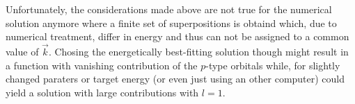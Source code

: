Unfortunately, the considerations made above are not true for the numerical solution anymore where a finite set of superpositions is obtaind which, due to numerical treatment, differ in energy and thus can not be assigned to a common value of $\vec{k}$.
Chosing the energetically best-fitting solution though might result in a function with vanishing contribution of the $p$-type orbitals while, for slightly changed paraters or target energy (or even just using an other computer) could yield a solution with large contributions with $l=1$.

%


